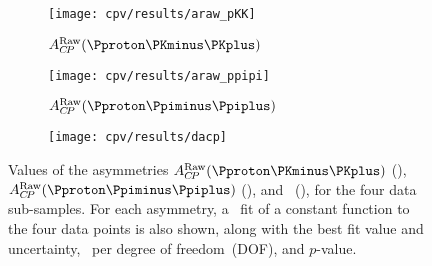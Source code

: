 \begin{figure}
  \begin{subfigure}[b]{0.5\textwidth}
    \texttt{[image: cpv/results/araw\_pKK]}
    \caption{$\ARaw(\pKK)$}
    \label{fig:cpv:results:asymmetries:pKK}
  \end{subfigure}
  \begin{subfigure}[b]{0.5\textwidth}
    \texttt{[image: cpv/results/araw\_ppipi]}
    \caption{$\ARaw(\ppipi)$}
    \label{fig:cpv:results:asymmetries:ppipi}
  \end{subfigure}

  \vspace{0.5cm}

  \begin{subfigure}[b]{\textwidth}
    \centering
    \texttt{[image: cpv/results/dacp]}
    \caption{\dACP}
    \label{fig:cpv:results:asymmetries:dacp}
  \end{subfigure}
  \caption{%
    Values of the asymmetries $\ARaw(\pKK)$ 
    (), $\ARaw(\ppipi)$ 
    (), and \dACP\ 
    (), for the four data 
    sub-samples.
    For each asymmetry, a \chisq\ fit of a constant function to the four data 
    points is also shown, along with the best fit value and uncertainty, 
    \chisq\ per degree of freedom~(DOF), and $p$-value.
  }
  \label{fig:cpv:results:asymmetries}
\end{figure}
